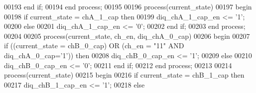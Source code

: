 \begin{DoxyCode}
00193    \textcolor{keywordflow}{end} \textcolor{keywordflow}{if};
00194 \textcolor{keywordflow}{end} \textcolor{keywordflow}{process};
00195 
00196 \textcolor{keywordflow}{process}(current_state)
00197 \textcolor{vhdlkeyword}{begin }
00198    \textcolor{keywordflow}{if} \textcolor{vhdlchar}{current_state} \textcolor{vhdlchar}{=} \textcolor{vhdlchar}{chA\_1\_cap} \textcolor{keywordflow}{then} 
00199       \textcolor{vhdlchar}{diq_chA_1_cap_en} \textcolor{vhdlchar}{<=} \textcolor{vhdlchar}{'}\textcolor{vhdllogic}{}\textcolor{vhdllogic}{1}\textcolor{vhdlchar}{'};
00200    \textcolor{keywordflow}{else} 
00201       \textcolor{vhdlchar}{diq_chA_1_cap_en} \textcolor{vhdlchar}{<=} \textcolor{vhdlchar}{'}\textcolor{vhdllogic}{}\textcolor{vhdllogic}{0}\textcolor{vhdlchar}{'};
00202    \textcolor{keywordflow}{end} \textcolor{keywordflow}{if};
00203 \textcolor{keywordflow}{end} \textcolor{keywordflow}{process};
00204 
00205 \textcolor{keywordflow}{process}(current_state, ch_en, diq_chA_0_cap)
00206 \textcolor{vhdlkeyword}{begin }
00207    \textcolor{keywordflow}{if} \textcolor{vhdlchar}{(}\textcolor{vhdlchar}{(}\textcolor{vhdlchar}{current_state} \textcolor{vhdlchar}{=} \textcolor{vhdlchar}{chB\_0\_cap}\textcolor{vhdlchar}{)} \textcolor{keywordflow}{OR} \textcolor{vhdlchar}{(}\textcolor{vhdlchar}{ch_en} \textcolor{vhdlchar}{=} \textcolor{vhdllogic}{"11"} \textcolor{keywordflow}{AND} \textcolor{vhdlchar}{diq_chA_0_cap}\textcolor{vhdlchar}{=}\textcolor{vhdlchar}{'}\textcolor{vhdllogic}{}\textcolor{vhdllogic}{1}\textcolor{vhdlchar}{'}\textcolor{vhdlchar}{)}\textcolor{vhdlchar}{)} \textcolor{keywordflow}{then} 
00208       \textcolor{vhdlchar}{diq_chB_0_cap_en} \textcolor{vhdlchar}{<=} \textcolor{vhdlchar}{'}\textcolor{vhdllogic}{}\textcolor{vhdllogic}{1}\textcolor{vhdlchar}{'};
00209    \textcolor{keywordflow}{else} 
00210       \textcolor{vhdlchar}{diq_chB_0_cap_en} \textcolor{vhdlchar}{<=} \textcolor{vhdlchar}{'}\textcolor{vhdllogic}{}\textcolor{vhdllogic}{0}\textcolor{vhdlchar}{'};
00211    \textcolor{keywordflow}{end} \textcolor{keywordflow}{if};
00212 \textcolor{keywordflow}{end} \textcolor{keywordflow}{process};
00213 
00214 \textcolor{keywordflow}{process}(current_state)
00215 \textcolor{vhdlkeyword}{begin }
00216    \textcolor{keywordflow}{if} \textcolor{vhdlchar}{current_state} \textcolor{vhdlchar}{=} \textcolor{vhdlchar}{chB\_1\_cap} \textcolor{keywordflow}{then} 
00217       \textcolor{vhdlchar}{diq_chB_1_cap_en} \textcolor{vhdlchar}{<=} \textcolor{vhdlchar}{'}\textcolor{vhdllogic}{}\textcolor{vhdllogic}{1}\textcolor{vhdlchar}{'};
00218    \textcolor{keywordflow}{else} 

\end{DoxyCode}
